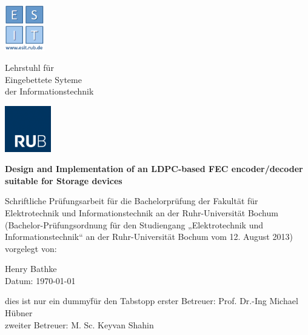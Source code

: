 
\begin{titlepage}
	\thispagestyle{empty}
	\begin{minipage}[b][2.5cm][r]{1.8cm}
	\centering
    \includegraphics[height=2cm, keepaspectratio]{Graphic/Logo.png}
	\end{minipage} \hspace{0.5mm}
	\begin{minipage}[b][2cm][l]{10cm}
	{Lehrstuhl für\\
	Eingebettete Syteme\\
	der Informationstechnik}
	\end{minipage} \hspace{5mm}
	\begin{minipage}[b][2.5cm][r]{2.5cm}
	\centering
    \includegraphics[height=2cm, keepaspectratio]{Graphic/RUB.png}
	\end{minipage}	
	
	
	\begin{center}
		\vspace{3cm}
		
		{\Large \textbf{Design and Implementation of an LDPC-based FEC encoder/decoder suitable for Storage devices}}
		
		\vspace{1cm}
		Schriftliche Prüfungsarbeit für die Bachelorprüfung der Fakultät für Elektrotechnik und Informationstechnik an der Ruhr-Universität Bochum (Bachelor-Prüfungsordnung für den Studiengang „Elektrotechnik und Informationstechnik“ an der Ruhr-Universität Bochum vom 12. August 2013)\\
		\vspace{1cm}
		{
			vorgelegt von: \\
		}
		
		\vspace{1.5cm}
		{
			Henry Bathke \\
		}
		\vspace{1.5cm}
		Datum: \today 
		\vspace{1.5cm}
		
		\begin{tabbing}
			dies ist nur ein dummy\= für den Tabstopp \kill
			erster Betreuer: \> Prof. Dr.-Ing Michael Hübner \\
			zweiter Betreuer: \> M. Sc. Keyvan Shahin
		\end{tabbing}
		
	\end{center}


\end{titlepage}
